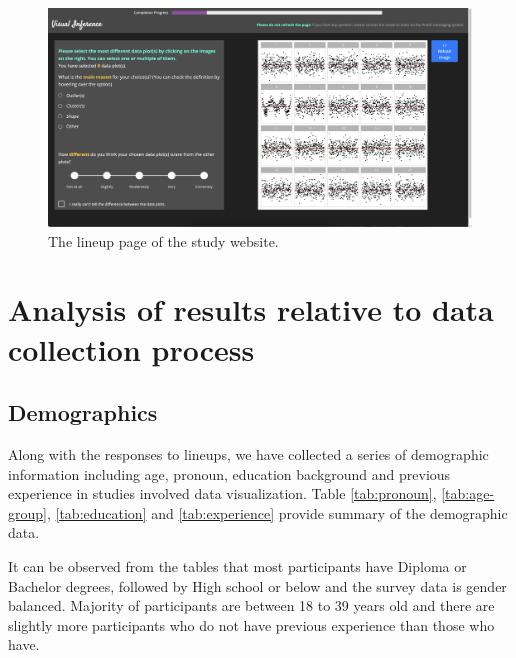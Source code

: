 \documentclass[]{interact}
\theoremstyle{plain}%
\theoremstyle{definition}
\theoremstyle{remark}
\begin{document}
\begin{figure}

{\centering \includegraphics[width=1\linewidth]{figures/lineup1} 

}

\caption{The lineup page of the study website.}\label{fig:lineup-page}
\end{figure}

\newpage

\hypertarget{analysis-of-results-relative-to-data-collection-process}{%
\section{Analysis of results relative to data collection
process}\label{analysis-of-results-relative-to-data-collection-process}}

\hypertarget{demographics}{%
\subsection{Demographics}\label{demographics}}

Along with the responses to lineups, we have collected a series of
demographic information including age, pronoun, education background and
previous experience in studies involved data visualization. Table
\ref{tab:pronoun}, \ref{tab:age-group}, \ref{tab:education} and
\ref{tab:experience} provide summary of the demographic data.

It can be observed from the tables that most participants have Diploma
or Bachelor degrees, followed by High school or below and the survey
data is gender balanced. Majority of participants are between 18 to 39
years old and there are slightly more participants who do not have
previous experience than those who have.
\end{document}
